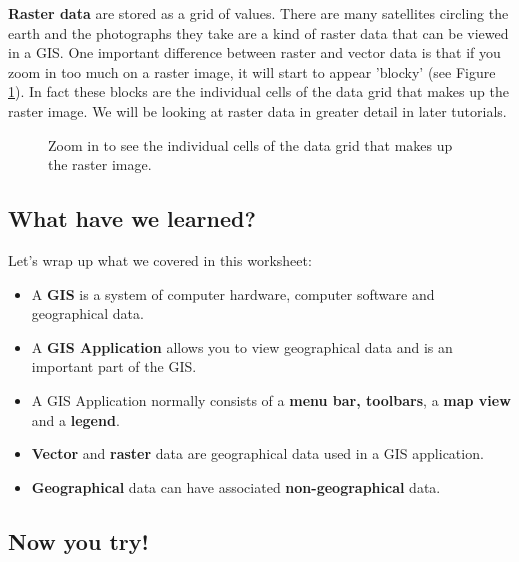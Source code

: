 \textbf{Raster data} are stored as a grid of values. There are many satellites
circling the earth and the photographs they take are a kind of raster data
that can be viewed in a GIS. One important difference between raster and
vector data is that if you zoom in too much on a raster image, it will start
to appear 'blocky' (see Figure \ref{fig:rasterdata}). In fact these blocks
are the individual cells of the data grid that makes up the raster image. We
will be looking at raster data in greater detail in later tutorials.

\begin{figure}[h]
\centering
\caption{Zoom in to see the individual cells of the data grid that makes up
the raster image.}\label{fig:rasterdata}
   \goodgap
\end{figure}

\subsection{What have we learned?}

Let's wrap up what we covered in this worksheet:

\begin{itemize}
\item A \textbf{GIS} is a system of computer hardware, computer software and
geographical data.
\item A \textbf{GIS Application} allows you to view geographical data and is
an important part of the GIS.
\item A GIS Application normally consists of a \textbf{menu bar, toolbars}, a
\textbf{map view} and a \textbf{legend}. 
\item \textbf{Vector} and \textbf{raster} data are geographical data used in
a GIS application.
\item \textbf{Geographical} data can have associated \textbf{non-geographical} data.
\end{itemize}

\subsection{Now you try!}

